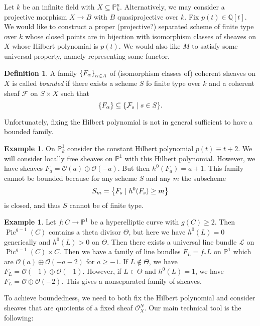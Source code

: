 \documentclass[leqno, openany]{memoir}
\theoremstyle{definition}
\newtheorem{defn}[thm]{Definition}
\newtheorem{exm}[thm]{Example}
\theoremstyle{remark}
\theoremstyle{plain}
\theoremstyle{definition}
\theoremstyle{remark}
\newcommand{\Q}{\mathbb{Q}}
\renewcommand{\P}{\mathbb{P}}
\newcommand{\mc}[1]{\mathcal{#1}}
\DeclareMathOperator{\Pic}{Pic}
\begin{document}
Let $k$ be an infinite field with $X \subseteq \P^n_k$. Alternatively, we may consider a projective morphism $X \to B$ with $B$ quasiprojective over $k$. Fix $p(t) \in \Q[t]$. We would like to construct a proper (projective?) separated scheme of finite type over $k$ whose closed points are in bijection with isomorphism classes of sheaves on $X$ whose Hilbert polynomial is $p(t)$. We would also like $M$ to satisfy some universal property, namely representing some functor.

\begin{defn}
    A family $\qty{F_{\alpha}}_{\alpha \in A}$ of (isomorphism classes of) coherent sheaves on $X$ is called \textit{bounded} if there exists a scheme $S$ fo finite type over $k$ and a coherent sheaf $\mc{F}$ on $S \times X$ such that 
    \[ \qty{F_{\alpha}} \subseteq \qty{\mc{F}_s \mid s \in S}. \]
\end{defn}

Unfortunately, fixing the Hilbert polynomial is not in general sufficient to have a bounded family.

\begin{exm}
    On $\P^1_k$ consider the constant Hilbert polynomial $p(t) \equiv t + 2$. We will consider locally free sheaves on $\P^1$ with this Hilbert polynomial. However, we have sheaves $F_a = \mc{O}(a) \oplus \mc{O}(-a)$. But then $h^0(F_a) = a+1$. This family cannot be bounded because for any scheme $S$ and any $m$ the subscheme
    \[ S_m = \qty{F_s \mid h^0(F_s) \geq m} \]
    is closed, and thus $S$ cannot be of finite type.
\end{exm}

\begin{exm}
    Let $f \colon C \to \P^1$ be a hyperelliptic curve with $g(C) \geq 2$. Then $\Pic^{g-1}(C)$ contains a theta divisor $\Theta$, but here we have $h^0(L) = 0$ generically and $h^0(L) > 0$ on $\Theta$. Then there exists a universal line bundle $\mc{L}$ on $\Pic^{g-1}(C) \times C$. Then we have a family of line bundles $F_L = f_* L$ on $\P^1$ which are $\mc{O}(a) \oplus \mc{O}(-a-2)$ for $a \geq -1$. If $L \notin \Theta$, we have $F_L = \mc{O}(-1) \oplus \mc{O}(-1)$. However, if $L \in \Theta$ and $h^0(L) = 1$, we have $F_L = \mc{O} \oplus \mc{O}(-2)$. This gives a nonseparated family of sheaves.
\end{exm}

To achieve boundedness, we need to both fix the Hilbert polynomial and consider sheaves that are quotients of a fixed sheaf $\mc{O}_X^N$. Our main technical tool is the following:
\end{document}
